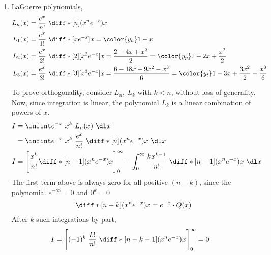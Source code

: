 \begin{enumerate}
\begin{enumerate}
              \item LaGuerre polynomials,
                    \begin{align}
                        L_n(x) & = \frac{e^x}{n!}\ \diff*[n]{(x^ne^{-x})}{x}          \\
                        L_1(x) & = \frac{e^x}{1!}\ \diff*{[xe^{-x}]}{x}
                        = \color{y_h} 1 - x                                           \\
                        L_2(x) & = \frac{e^x}{2!}\ \diff*[2]{[x^2e^{-x}]}{x}
                        = \frac{2 - 4x + x^2}{2} = \color{y_p} 1 - 2x + \frac{x^2}{2} \\
                        L_3(x) & = \frac{e^x}{3!}\ \diff*[3]{[x^3e^{-x}]}{x}
                        = \frac{6 - 18x + 9x^2 - x^3}{6}
                        = \color{y_t}1 - 3x + \frac{3x^2}{2} - \frac{x^3}{6}
                    \end{align}

                    To prove orthogonality, consider $ L_n,\ L_k $ with $ k < n $,
                    without loss of generality. Now, since integration is linear, the
                    polynomial $ L_k $ is a linear combination of powers of $ x $.
                    \begin{align}
                        I & =  \infint e^{-x}\ x^k\ L_n(x)\ \dl x              \\
                          & = \infint e^{-x}\ x^k\
                        \frac{e^x}{n!}\ \diff*[n]{(x^ne^{-x})}{x}\ \dl x       \\
                        I & = \Bigg[\frac{x^k}{n!} \diff*[n-1]{(x^ne^{-x})}{x}
                        \Bigg]_{0}^{\infty} - \int_{0}^{\infty}
                        \frac{kx^{k-1}}{n!}\ \diff*[n-1]{(x^ne^{-x})}{x}\ \dl x
                    \end{align}
                    The first term above is always zero for all positive $ (n-k) $,
                    since the polynomial $ e^{-\infty} = 0 $ and $ 0^k = 0 $
                    \begin{align}
                        \diff*[n-k]{(x^ne^{-x})}{x} = e^{-x} \cdot Q(x)
                    \end{align}
                    After $ k $ such integrations by part,
                    \begin{align}
                        I & = \Bigg[(-1)^k\ \frac{k!}{n!}
                        \ \diff*[n-k-1]{(x^ne^{-x})}{x}\Bigg]_{0}^{\infty} = 0
                    \end{align}
          \end{enumerate}
\end{enumerate}

